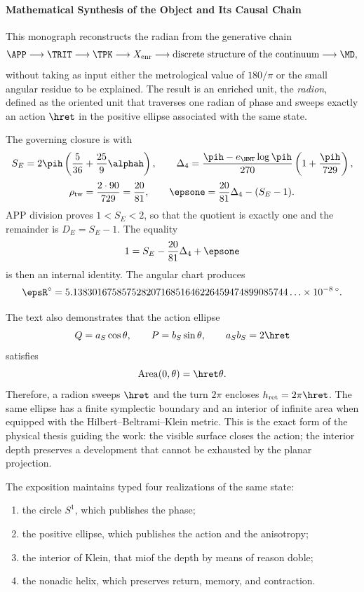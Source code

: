 \paragraph{Mathematical Synthesis of the Object and Its Causal Chain}

This monograph reconstructs the radian from the generative chain
\[
\APP\longrightarrow\TRIT\longrightarrow\TPK
\longrightarrow X_{\mathrm{enr}}
\longrightarrow\text{discrete structure of the continuum}
\longrightarrow\MD,
\]
without taking as input either the metrological value of \(180/\pi\) or the small angular residue to be explained. The result is an enriched unit, the \emph{radion}, defined as the oriented unit that traverses one radian of phase and sweeps exactly an action \(\hret\) in the positive ellipse associated with the same state.

The governing closure is
\BigRadionEquation
with
\[
S_E=2\pih\left(\frac5{36}+\frac{25}{9}\alphah\right),
\qquad
\Delta_4=
\frac{\pih-e_{\HMT}\log\pih}{270}
\left(1+\frac{\pih}{729}\right),
\]
\[
\rho_{\mathrm{tw}}=\frac{2\cdot90}{729}=\frac{20}{81},
\qquad
\epsone=\frac{20}{81}\Delta_4-(S_E-1).
\]
APP division proves \(1<S_E<2\), so that the quotient is exactly
one and the remainder is \(D_E=S_E-1\). The equality
\[
1=S_E-\frac{20}{81}\Delta_4+\epsone
\]
is then an internal identity. The angular chart produces
\[
\epsR^\circ
=5.13830167585752820716851646226459474899085744\ldots
\times10^{-8}\,{}^\circ.
\]

The text also demonstrates that the action ellipse
\[
Q=a_S\cos\theta,\qquad P=b_S\sin\theta,\qquad
a_Sb_S=2\hret
\]
satisfies
\[
\operatorname{Area}(0,\theta)=\hret\theta.
\]
Therefore, a radion sweeps \(\hret\) and the turn \(2\pi\) encloses
\(h_{\mathrm{ret}}=2\pi\hret\). The same ellipse has a finite symplectic
boundary and an interior of infinite area when equipped with the
Hilbert--Beltrami--Klein metric. This is the exact form of the physical thesis guiding
the work: the visible surface closes the action; the interior depth
preserves a development that cannot be exhausted by the planar projection.

The exposition maintains typed four realizations of the same state:

\begin{enumerate}[label=\textbf{\arabic*.}]
\item the circle \(S^1\), which publishes the phase;
\item the positive ellipse, which publishes the action and the anisotropy;
\item the interior of Klein, that miof the depth by means of reason doble;
\item the nonadic helix, which preserves return, memory, and contraction.
\end{enumerate}

